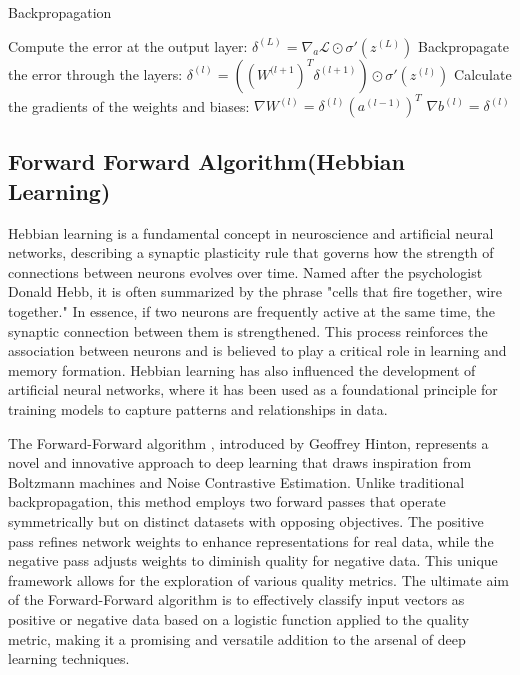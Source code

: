 \documentclass[nohyperref]{article}
\theoremstyle{plain}
\theoremstyle{definition}
\theoremstyle{remark}
\begin{document}
\begin{algorithm}[tb]
     \caption{Backpropagation}
   \label{alg:BP}

  \begin{algorithmic}
\STATE Compute the error at the output layer:
\STATE $\delta^{(L)} = \nabla_a \mathcal{L} \odot \sigma'(z^{(L)})$
    \STATE Backpropagate the error through the layers:
    \STATE $\delta^{(l)} = ((W^{(l+1})^T \delta^{(l+1)}) \odot \sigma'(z^{(l)})$
    \STATE Calculate the gradients of the weights and biases:
    \STATE $\nabla W^{(l)} = \delta^{(l)}(a^{(l-1)})^T$
    \STATE $\nabla b^{(l)} = \delta^{(l)}$
\ENDFOR    
\end{algorithmic}
\end{algorithm}



\subsection{Forward Forward Algorithm(Hebbian Learning)}
Hebbian learning\cite{journe2022hebbian} is a fundamental concept in neuroscience and artificial neural networks, describing a synaptic plasticity rule that governs how the strength of connections between neurons evolves over time. Named after the psychologist Donald Hebb, it is often summarized by the phrase "cells that fire together, wire together." In essence, if two neurons are frequently active at the same time, the synaptic connection between them is strengthened. This process reinforces the association between neurons and is believed to play a critical role in learning and memory formation. Hebbian learning has also influenced the development of artificial neural networks, where it has been used as a foundational principle for training models to capture patterns and relationships in data.

The Forward-Forward algorithm \cite{hinton2022forward}, introduced by Geoffrey Hinton, represents a novel and innovative approach to deep learning that draws inspiration from Boltzmann machines and Noise Contrastive Estimation. Unlike traditional backpropagation, this method employs two forward passes that operate symmetrically but on distinct datasets with opposing objectives. The positive pass refines network weights to enhance representations for real data, while the negative pass adjusts weights to diminish quality for negative data. This unique framework allows for the exploration of various quality metrics. The ultimate aim of the Forward-Forward algorithm is to effectively classify input vectors as positive or negative data based on a logistic function applied to the quality metric, making it a promising and versatile addition to the arsenal of deep learning techniques.
\end{document}

